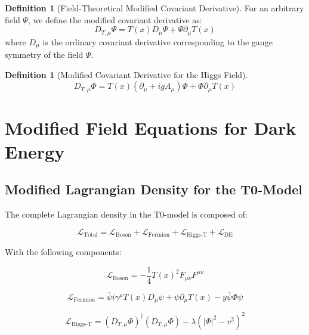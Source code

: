 \documentclass[a4paper,12pt]{article}
\theoremstyle{definition}
\newtheorem{definition}[theorem]{Definition}
\theoremstyle{remark}
\newcommand{\Tfield}{T(x)} %
\newcommand{\DcovT}[1]{\Tfield D_\mu #1 + #1 \partial_\mu \Tfield}
\newcommand{\DhiggsT}{\Tfield (\partial_\mu + igA_\mu)\Phi + \Phi \partial_\mu \Tfield}
\begin{document}
	\begin{definition}[Field-Theoretical Modified Covariant Derivative]
		For an arbitrary field \(\Psi\), we define the modified covariant derivative as:
		\begin{equation}
			D_{T,\mu}\Psi = \Tfield D_\mu \Psi + \Psi \partial_\mu \Tfield
		\end{equation}
		where \(D_\mu\) is the ordinary covariant derivative corresponding to the gauge symmetry of the field \(\Psi\).
	\end{definition}
	
	\begin{definition}[Modified Covariant Derivative for the Higgs Field]
		\begin{equation}
			D_{T,\mu}\Phi = \DhiggsT
		\end{equation}
	\end{definition}
	
	\section{Modified Field Equations for Dark Energy}
	
	\subsection{Modified Lagrangian Density for the T0-Model}
	
	The complete Lagrangian density in the T0-model is composed of:
	
	\begin{equation}
		\mathcal{L}_{\text{Total}} = \mathcal{L}_{\text{Boson}} + \mathcal{L}_{\text{Fermion}} + \mathcal{L}_{\text{Higgs-T}} + \mathcal{L}_{\text{DE}}
	\end{equation}
	
	With the following components:
	
	\begin{equation}
		\mathcal{L}_{\text{Boson}} = -\frac{1}{4} \Tfield^2 F_{\mu\nu}F^{\mu\nu}
	\end{equation}
	
	\begin{equation}
		\mathcal{L}_{\text{Fermion}} = \bar{\psi}i\gamma^\mu \DcovT{\psi} - y\bar{\psi}\Phi\psi
	\end{equation}
	
	\begin{equation}
		\mathcal{L}_{\text{Higgs-T}} = (D_{T,\mu}\Phi)^\dagger (D_{T,\mu}\Phi) - \lambda(|\Phi|^2 - v^2)^2
	\end{equation}
	
\end{document}
